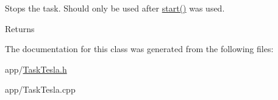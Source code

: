 Stops the task. Should only be used after \hyperlink{class_task_tesla_a42c4e57484a682500f4c0c3079df494e}{start()} was used. 

\begin{DoxyReturn}{Returns}

\end{DoxyReturn}


The documentation for this class was generated from the following files\+:\begin{DoxyCompactItemize}
\item 
app/\hyperlink{_task_tesla_8h}{Task\+Tesla.\+h}\item 
app/Task\+Tesla.\+cpp\end{DoxyCompactItemize}
